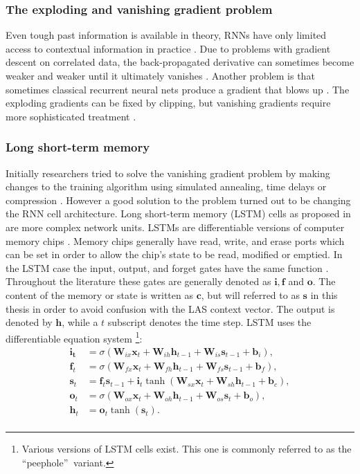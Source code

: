 \subsubsection{The exploding and vanishing gradient problem}
Even tough past information is available in theory, RNNs have only limited access to contextual information in practice \cite[page 1]{Graves2008}. Due to problems with gradient descent on correlated data, the back-propagated derivative can sometimes become weaker and weaker until it ultimately vanishes \cite{Hochreiter1998}. Another problem is that sometimes classical recurrent neural nets produce a gradient that blows up \cite{Pascanu2012}. The exploding gradients can be fixed by clipping, but vanishing gradients require more sophisticated treatment \cite{Bengio1993}.

\subsubsection{Long short-term memory}
Initially researchers tried to solve the vanishing gradient problem by making changes to the training algorithm using simulated annealing, time delays or compression \cite[page 32]{Graves2008}. However a good solution to the problem turned out to be changing the RNN cell architecture. Long short-term memory (LSTM) cells as proposed in \cite{Hochreiter1995} are more complex network units. LSTMs are differentiable versions of computer memory chips \cite[page 37]{Graves2012}. Memory chips generally have read, write, and erase ports which can be set in order to allow the chip's state to be read, modified or emptied. In the LSTM case the input, output, and forget gates have the same function \cite[page 33]{Graves2008}. Throughout the literature these gates are generally denoted as $\mathbf{i}, \mathbf{f}$ and $\mathbf{o}$. The content of the memory or state is written as $\mathbf{c}$, but will referred to as $\mathbf{s}$ in this thesis in order to avoid confusion with the LAS context vector. The output is denoted by $\mathbf{h}$, while a $t$ subscript denotes the time step.
LSTM uses the differentiable equation system \cite[page 5]{Graves2013}\footnote{ Various versions of LSTM cells exist. This one is commonly referred to as the \textquotedblleft peephole\textquotedblright $ \: $ variant. }:
\begin{align}
\mathbf{i_t} &= \sigma (\mathbf{W}_{ix} \mathbf{x}_t + \mathbf{W}_{ih} \mathbf{h}_{t-1} + \mathbf{W}_{is} \mathbf{s}_{t-1} +\mathbf{b}_i), \\
\mathbf{f}_t &= \sigma (\mathbf{W}_{fx} \mathbf{x}_t + \mathbf{W}_{fh} \mathbf{h}_{t-1} + \mathbf{W}_{fs} \mathbf{s}_{t-1} +\mathbf{b}_f), \\
\mathbf{s}_t &= \mathbf{f}_t \mathbf{s}_{t-1} + \mathbf{i}_t \tanh( \mathbf{W}_{sx} \mathbf{x}_t + \mathbf{W}_{sh} \mathbf{h}_{t-1} + \mathbf{b}_c ), \\
\mathbf{o}_t &= \sigma (\mathbf{W}_{ox} \mathbf{x}_t + \mathbf{W}_{oh} \mathbf{h}_{t-1} + \mathbf{W}_{os} \mathbf{s}_t + \mathbf{b}_o ), \\
\mathbf{h}_t &= \mathbf{o}_t \tanh(\mathbf{s}_t). \\
\end{align}
